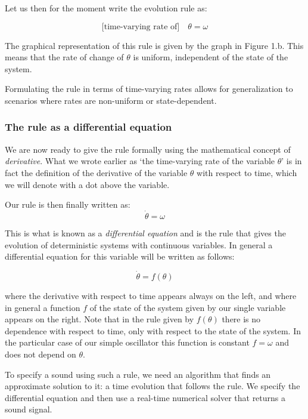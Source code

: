 \documentclass{article}
\begin{document}
Let us then for the moment write the evolution rule as: 

\[
\text{[time-varying rate of]} \quad \theta = \omega
\]

The graphical representation of this rule is given by the graph in Figure 1.b. This means that the rate of change of $\theta$ is uniform, independent of the state of the system. 

Formulating the rule in terms of time-varying rates allows for generalization to scenarios where rates are non-uniform or state-dependent.

\subsubsection{The rule as a differential equation}

We are now ready to give the rule formally using the mathematical concept of {\em derivative}. 
What we wrote earlier as `the time-varying rate of the variable $\theta$' is in fact the definition of the derivative of the variable $\theta$ with respect to time, which we will denote with a dot above the variable. 

Our rule is then finally written as: 
\begin{equation}
\dot\theta = \omega    
\end{equation}

This is what is known as a \emph{differential equation} and is the rule that gives the evolution of deterministic systems with continuous variables. 
In general a differential equation for this variable will be written as follows:

\begin{equation}
\dot\theta = f(\theta)    
\end{equation}

where the derivative with respect to time appears always on the left, and where in general a function $f$ of the state of the system given by our single variable appears on the right.
Note that in the rule given by $f(\theta)$ there is no dependence with respect to time, only with respect to the state of the system.
In the particular case of our simple oscillator this function is constant $f=\omega$ and does not depend on $\theta$. 

To specify a sound using such a rule, we need an algorithm that finds an approximate solution to it: a time evolution that follows the rule. We specify the differential equation and then use a real-time numerical solver that returns a sound signal.
\end{document}

